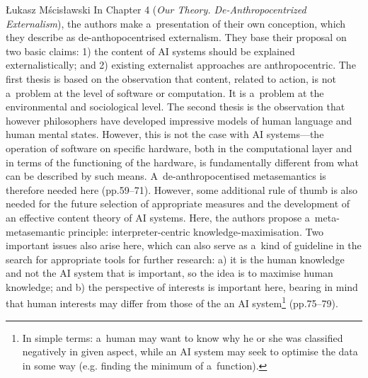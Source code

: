 \begin{newrevengenv}{Łukasz Mścisławski}
\enlargethispage{.5\baselineskip}
In Chapter 4 (\textit{Our Theory. De-Anthropocentrized Externalism}), the authors make a~presentation of their own conception, which they describe as de-anthopocentrised externalism. They base their proposal on two basic claims: 1) the content of AI systems should be explained externalistically; and 2) existing externalist approaches are anthropocentric. The first thesis is based on the observation that content, related to action, is not a~problem at the level of software or computation. It is a~problem at the environmental and sociological level. The second thesis is the observation that however philosophers have developed impressive models of human language and human mental states. However, this is not the case with AI systems---the operation of software on specific hardware, both in the computational layer and in terms of the functioning of the hardware, is fundamentally different from what can be described by such means. A~de-anthropocentised metasemantics is therefore needed here (pp.59--71). However, some additional rule of thumb is also needed for the future selection of appropriate measures and the development of an effective content theory of AI systems. Here, the authors propose a~meta-metasemantic principle: interpreter-centric knowledge-maximisation. Two important issues also arise here, which can also serve as a~kind of guideline in the search for appropriate tools for further research: a) it is the human knowledge and not the AI system that is important, so the idea is to maximise human knowledge; and b) the perspective of interests is important here, bearing in mind that human interests may differ from those of the an AI system\footnote{In simple terms: a~human may want to know why he or she was classified negatively in given aspect, while an AI system may seek to optimise the data in some way (e.g. finding the minimum of a~function).} (pp.75--79).


\end{newrevengenv}
